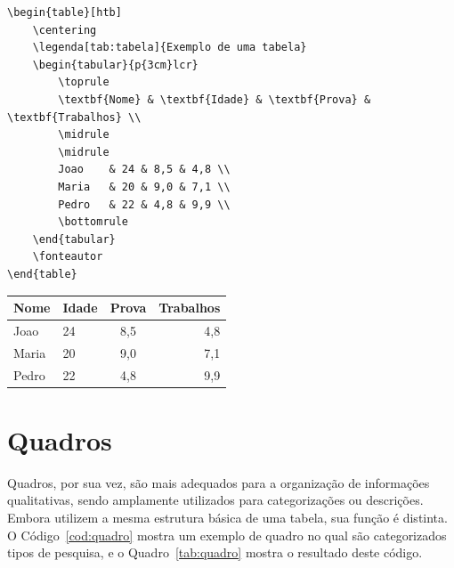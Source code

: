 \begin{codigo}[htb]
\begin{lstlisting}
\begin{table}[htb]
    \centering
    \legenda[tab:tabela]{Exemplo de uma tabela}
    \begin{tabular}{p{3cm}lcr}
        \toprule
        \textbf{Nome} & \textbf{Idade} & \textbf{Prova} & \textbf{Trabalhos} \\
        \midrule
        \midrule
        Joao    & 24 & 8,5 & 4,8 \\
        Maria   & 20 & 9,0 & 7,1 \\
        Pedro   & 22 & 4,8 & 9,9 \\
        \bottomrule
    \end{tabular}
    \fonteautor
\end{table}
\end{lstlisting}
\fonteautor
\end{codigo}

\begin{table}[htb]
    \centering
    \begin{tabular}{p{3cm}lcr}
        \toprule
        \textbf{Nome} & \textbf{Idade} & \textbf{Prova} & \textbf{Trabalhos} \\
        \midrule
        \midrule
        Joao    & 24 & 8,5 & 4,8 \\
        Maria   & 20 & 9,0 & 7,1 \\
        Pedro   & 22 & 4,8 & 9,9 \\
        \bottomrule
    \end{tabular}
    \fonteautor
\end{table}

\section{Quadros}

Quadros, por sua vez, são mais adequados para a organização de informações qualitativas, sendo amplamente utilizados para categorizações ou descrições. Embora utilizem a mesma estrutura básica de uma tabela, sua função é distinta. O Código~\ref{cod:quadro} mostra um exemplo de quadro no qual são categorizados tipos de pesquisa, e o Quadro~\ref{tab:quadro} mostra o resultado deste código.

